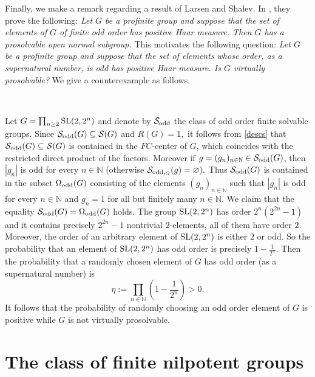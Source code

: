 \documentclass{amsart}
\numberwithin{equation}{section}
\begin{document}

Finally, we make a remark regarding a result of Larsen and Shalev. In \cite{ls}, they prove the following: {\sl{Let $G$ be a profinite group and suppose that the set of elements of $G$ of finite odd order has positive Haar measure. Then $G$ has a prosolvable open normal subgroup.}} This motivates the following question:	{\sl{Let $G$ be a profinite group and suppose that the set of elements whose order, as a supernatural number, is odd has positive Haar measure. Is $G$ virtually prosolvable?}} We give a counterexample as follows.

\

Let $G=\prod_{n \geq 2}{\rm{SL}}(2,2^n)$ and denote by $\mathcal S_{\rm{odd}}$ the class of odd order finite solvable groups. Since $\mathcal S_{\rm{odd}}(G) \subseteq \mathcal S (G)$
and $R(G)=1,$ it follows from \cref{descs} that 
$\mathcal S_{\rm{odd}}(G) \subseteq \mathcal S(G)$ is contained in the $FC$-center of $G$, which coincides with the restricted direct product of the factors.
Moreover if $g=(g_n)_{n\in \mathbb N}\in \mathcal S_{\rm{odd}}(G)$, then $|g_n|$ is odd for every $n\in \mathbb N$ (otherwise $\mathcal S_{{\rm{odd}},_G}(g) =\varnothing).$ Thus 
$\mathcal{S}_{\rm{odd}}(G)$ is contained in the subset
$\Omega_{\rm{odd}}(G)$ consisting of the elements $(g_n)_{n\in \mathbb N}$
such that $|g_n|$ is odd for every $n\in \mathbb N$
and $g_n=1$ for all but finitely many $n\in \mathbb N.$ We claim that the equality $\mathcal{S}_{\rm{odd}}(G) = \Omega_{\rm{odd}}(G)$ holds. The group ${\rm{SL}}(2,2^n)$ has order $2^n(2^{2n}-1)$ and it contains precisely $2^{2n}-1$ nontrivial $2$-elements, %
all of them have order $2$. Moreover, the order of an arbitrary element of ${\rm{SL}}(2,2^n)$ is either $2$ or odd. So the probability that an element of ${\rm{SL}}(2,2^n)$ has odd order is precisely $1-\frac{1}{2^n}.$
Then the probability that a randomly chosen element of $G$ has odd order (as a supernatural number) is
$$\eta:=\prod_{n \in \mathbb N}\left(1-\frac{1}{2^n}\right)>0.$$
It follows that the probability of randomly choosing an odd order element of $G$ is positive while $G$ is not virtually prosolvable.

\section{The class of finite nilpotent groups}\label{nilpot}
\end{document}
